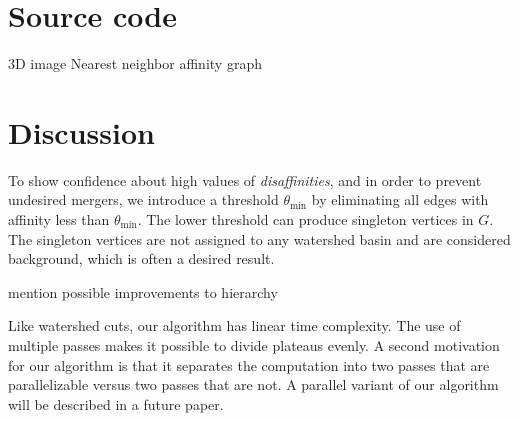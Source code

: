 \documentclass{article}
\begin{document}
\section{Source code}
3D image
Nearest neighbor affinity graph 

\section{Discussion}
To show confidence about high values of \emph{disaffinities}, and in
order to prevent undesired mergers, we introduce a threshold
$\theta_{\min}$ by eliminating all edges with affinity less than
$\theta_{\min}$. The lower threshold can produce singleton vertices in
$G$. The singleton vertices are not assigned to any watershed basin
and are considered background, which is often a desired result.

mention possible improvements to hierarchy

Like watershed cuts, our algorithm has linear time complexity.  The
use of multiple passes makes it possible to divide plateaus evenly.  A
second motivation for our algorithm is that it separates the
computation into two passes that are parallelizable versus two passes
that are not.  A parallel variant of our algorithm will be described
in a future paper.





{\small


}
\end{document}
